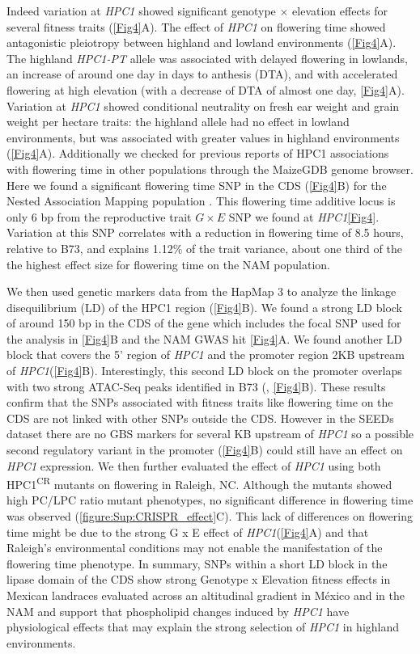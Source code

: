 \documentclass[9pt,twocolumn,twoside,lineno]{biorxiv}
\newcommand{\hpc}{\textit{HPC1}\xspace}
\begin{document}
Indeed variation at \hpc showed significant genotype $\times$ elevation effects for several fitness traits (\cref{Fig4}A). 
The effect of \hpc on flowering time showed antagonistic pleiotropy between highland and lowland environments (\cref{Fig4}A). 
The highland \textit{HPC1-PT} allele was associated with delayed flowering in lowlands, an increase of around one day in days to anthesis (DTA), and with accelerated flowering at high elevation (with a decrease of DTA of almost one day, \cref{Fig4}A).
Variation at \hpc showed conditional neutrality on fresh ear weight and grain weight per hectare traits: the highland allele had no effect in lowland environments, but was associated with greater values in highland environments (\cref{Fig4}A).
Additionally we checked for previous reports of HPC1 associations with flowering time in other populations through the MaizeGDB \cite{Woodhouse2021-wd} genome browser. Here we found a significant flowering time SNP in the  CDS (\cref{Fig4}B) for the Nested Association Mapping population \cite{Wallace2014-yy}. This flowering time additive locus is only 6 bp from the reproductive trait $G \times E$ SNP we found at \hpc \cref{Fig4}. Variation at this SNP correlates with a reduction in flowering time of 8.5 hours, relative to B73, and explains 1.12\% of the trait variance, about one third of the the highest effect size for flowering time on the NAM population. 


We then used genetic markers data from the HapMap 3 \cite{Bukowski2017-ng} to analyze the linkage disequilibrium (LD) of the HPC1 region (\cref{Fig4}B).
We found a strong LD block of around 150 bp in the CDS of the gene which includes the focal SNP used for the analysis in \cref{Fig4}B and the  NAM GWAS hit \cref{Fig4}A. 
We found another LD block that covers the 5' region of \hpc and the promoter region 2KB upstream of \hpc (\cref{Fig4}B). 
Interestingly, this second LD block on the promoter overlaps with two strong ATAC-Seq peaks identified in B73 (\cite{Ricci2019-zj}, \cref{Fig4}B).
These results confirm that the SNPs associated with fitness traits like flowering time on the  CDS are not linked with other SNPs outside the  CDS.
However in the SEEDs dataset there are no GBS markers for several KB upstream of \hpc so a possible second regulatory variant in the promoter (\cref{Fig4}B) could still have an effect on \hpc expression. 
We then further evaluated the effect of \hpc using both HPC1\textsuperscript{CR} mutants on flowering in Raleigh, NC. 
Although the mutants showed high PC/LPC ratio mutant phenotypes, no significant difference in flowering time was observed (\cref{figure:Sup:CRISPR_effect}C). 
This lack of differences on flowering time might be due to the strong G x E effect of \hpc (\cref{Fig4}A) and that Raleigh's environmental conditions may not enable the manifestation of the flowering time phenotype.
In summary, SNPs within a short LD block in the lipase domain of the  CDS show strong Genotype x Elevation fitness effects in Mexican landraces evaluated across an altitudinal gradient in M\'exico and in the NAM and support that phospholipid changes induced by \hpc have physiological effects that may explain the strong selection of \hpc in highland environments.
\end{document}
